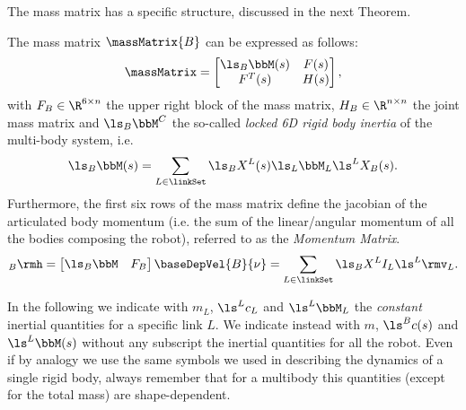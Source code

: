 
The mass matrix has a specific structure, discussed in the next Theorem.

\begin{theorem}
\label{thm:massMatrixStructure}
The mass matrix $\massMatrix{B}$ can be expressed as follows:
\begin{equation}
\label{eq:massMatrixStructure}
\massMatrix
= 
\begin{bmatrix}
\ls_{B} \bbM(s) & F(s) \\
F^{T}(s) & H(s)
\end{bmatrix},
\end{equation}
with $F_B \in \R^{6 \times n}$ the upper right block of the mass matrix, $H_B \in \R^{n \times n}$ the joint mass matrix and
$\ls_{{B}} \bbM^C$ the so-called \emph{locked 6D rigid body inertia}  of the multi-body system, i.e. 
\begin{equation}
\ls_{{B}} \bbM(s) = \sum_{L \in \linkSet} \ls_{{B}} X^L(s) \ls_L \bbM_L \ls^L X_{{B}}(s).
 \end{equation}
Furthermore, 
the first six rows of the mass matrix define the jacobian of the articulated body momentum (i.e. the sum of the linear/angular momentum of all the bodies composing the robot), referred to as the \emph{Momentum Matrix}. 
\begin{equation}
\label{eq:momentumMatrix}
{}_{{B}} \rmh =
\begin{bmatrix}
\ls_{{B}} \bbM & F_B
\end{bmatrix} \baseDepVel{B}{\nu} = 
 \sum_{L \in \linkSet} \ls_{{B}} X^L I_L \ls^L \rmv_L.
\end{equation}
\end{theorem}

\begin{remark}
In the following we indicate with $m_L$, $\ls^L c_L$ and $\ls^L \bbM_L$ the \emph{constant} inertial quantities for a specific link $L$. We indicate instead with $m$, $\ls^B c(s)$ and $\ls^L \bbM(s)$ without any subscript the inertial quantities for all the robot. Even if by analogy we use the same symbols we used in describing the dynamics of a single rigid body, always remember that for a multibody this quantities (except for the total mass) are shape-dependent.   
\end{remark}


